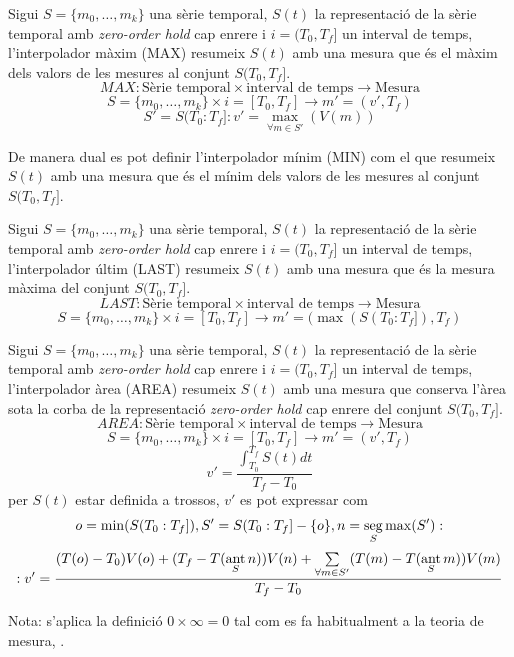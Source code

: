 \begin{definition}
  Sigui $S=\{m_0,\ldots,m_k\}$ una sèrie temporal, $S(t)$ la
  representació de la sèrie temporal amb \emph{zero-order hold} cap
  enrere i $i=(T_0,T_f]$ un interval de temps, l'interpolador màxim
  (MAX) resumeix $S(t)$ amb una mesura que és el màxim dels valors
  de les mesures al conjunt $S(T_0,T_f]$.
\[
MAX: \text{Sèrie temporal} \times \text{interval de temps} \longrightarrow \text{Mesura}
\]
\[
S=\{m_0,\ldots,m_k\} \times i=[T_0,T_f]  \longrightarrow m'=(v',T_f)
\]
\[
S'=S(T_0:T_f]:
v' = \max_{\forall m \in S'}(V(m))
\]
\end{definition}

De manera dual es pot definir l'interpolador mínim (MIN) com el
que resumeix $S(t)$ amb una mesura que és el mínim dels valors de les
mesures al conjunt $S(T_0,T_f]$.


\begin{definition}
  Sigui $S=\{m_0,\ldots,m_k\}$ una sèrie temporal, $S(t)$ la
  representació de la sèrie temporal amb \emph{zero-order hold} cap
  enrere i $i=(T_0,T_f]$ un interval de temps, l'interpolador últim
  (LAST) resumeix $S(t)$ amb una mesura que és la mesura màxima del
  conjunt $S(T_0,T_f]$.
\[
LAST: \text{Sèrie temporal} \times \text{interval de temps} \longrightarrow \text{Mesura}
\]
\[
S=\{m_0,\ldots,m_k\} \times i=[T_0,T_f]  \longrightarrow m'=(\max(S(T_0:T_f]),T_f)
\]
\end{definition}



\begin{definition}
  Sigui $S=\{m_0,\ldots,m_k\}$ una sèrie temporal, $S(t)$ la
  representació de la sèrie temporal amb \emph{zero-order hold} cap
  enrere i $i=(T_0,T_f]$ un interval de temps, l'interpolador àrea
  (AREA) resumeix $S(t)$ amb una mesura que conserva l'àrea sota la
  corba de la representació \emph{zero-order hold} cap enrere del
  conjunt $S(T_0,T_f]$.
\[
AREA: \text{Sèrie temporal} \times \text{interval de temps} \longrightarrow \text{Mesura}
\]
\[
S=\{m_0,\ldots,m_k\} \times i=[T_0,T_f]  \longrightarrow m'=(v',T_f)
\]
\[
v' = 
\frac{\int_{T_0}^{T_f} S(t) dt}{T_f - T_0}
\]
per $S(t)$ estar definida a trossos, $v'$ es pot expressar com
\[
o=\min(S(T_0:T_f]),
S'= S(T_0:T_f] - \{o\},
n=\seg\limits_S \max(S'): %
\]
\[
:v'= \frac{(T(o)-T_0)V(o) 
+( T_f- T(\operatorname*{ant}\limits_S n) )V(n) 
+\sum\limits_{\forall m \in S'}( T(m)- T(\operatorname*{ant}\limits_S m) )V(m)}
{T_f-T_0} 
\]

Nota: s'aplica la definició $0 \times \infty = 0$ tal com es fa habitualment a la teoria de mesura, \cite{wiki:extendedreal}.
\end{definition}

